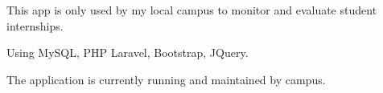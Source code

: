\documentclass[letterpaper]{deedy-resume} %
\begin{document}
\begin{minipage}[t]{0.66\textwidth}
\begin{tightitemize}
\item This app is only used by my local campus to monitor and evaluate student internships.
\item Using MySQL, PHP Laravel, Bootstrap, JQuery.
\item The application is currently running and maintained by campus.
\end{tightitemize}
\sectionspace







\end{minipage} %
\end{document}

